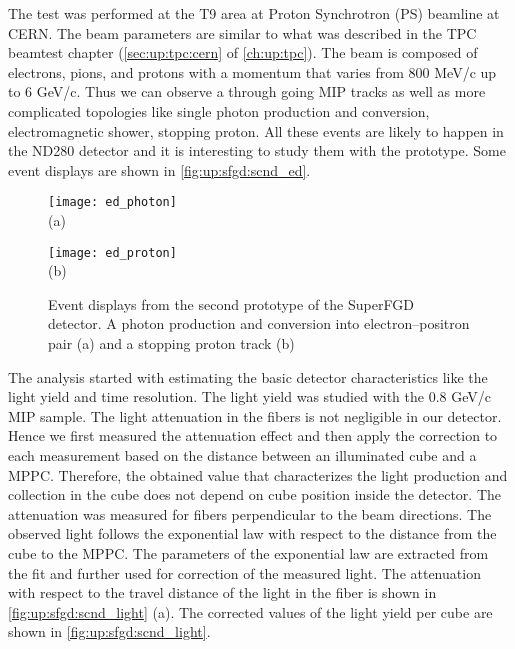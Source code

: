 \documentclass[main.tex]{subfiles}
\begin{document}
The test was performed at the T9 area at Proton Synchrotron (PS) beamline at CERN. The beam parameters are similar to what was described in the TPC beamtest chapter (\autoref{sec:up:tpc:cern} of \autoref{ch:up:tpc}). The beam is composed of electrons, pions, and protons with a momentum that varies from 800 MeV/c up to 6 GeV/c. Thus we can observe a through going MIP tracks as well as more complicated topologies like single photon production and conversion, electromagnetic shower, stopping proton. All these events are likely to happen in the ND280 detector and it is interesting to study them with the prototype. Some event displays are shown in \autoref{fig:up:sfgd:scnd_ed}.

\begin{figure}[!ht]
	\centering
	\begin{minipage}{0.49\linewidth}
		\centering
		\texttt{[image: ed\_photon]} \\ (a)
	\end{minipage}
	\begin{minipage}{0.49\linewidth}
		\centering
		\texttt{[image: ed\_proton]} \\ (b)
	\end{minipage}
	\caption{Event displays from the second prototype of the SuperFGD detector. A photon production and conversion into electron--positron pair (a) and a stopping proton track (b)}
	\label{fig:up:sfgd:scnd_ed}
\end{figure}

The analysis started with estimating the basic detector characteristics like the light yield and time resolution. The light yield was studied with the 0.8 GeV/c MIP sample. The light attenuation in the fibers is not negligible in our detector. Hence we first measured the attenuation effect and then apply the correction to each measurement based on the distance between an illuminated cube and a MPPC. Therefore, the obtained value that characterizes the light production and collection in the cube does not depend on cube position inside the detector. The attenuation was measured for fibers perpendicular to the beam directions. The observed light follows the exponential law with respect to the distance from the cube to the MPPC. The parameters of the exponential law are extracted from the fit and further used for correction of the measured light. The attenuation with respect to the travel distance of the light in the fiber is shown in \autoref{fig:up:sfgd:scnd_light} (a). The corrected values of the light yield per cube are shown in \autoref{fig:up:sfgd:scnd_light}.
\end{document}
